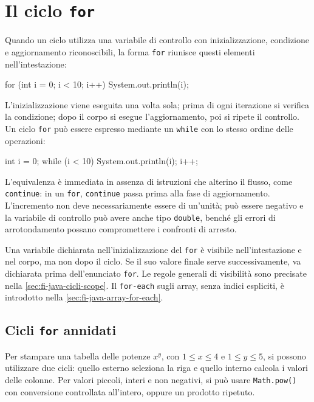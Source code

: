\section{Il ciclo \texttt{for}}
\label{sec:fi-java-cicli-for}

Quando un ciclo utilizza una variabile di controllo con
inizializzazione, condizione e aggiornamento riconoscibili,
la forma \texttt{for} riunisce questi elementi nell'intestazione:

\begin{unipdcode}[language=Java]
for (int i = 0; i < 10; i++) {
    System.out.println(i);
}
\end{unipdcode}

L'inizializzazione viene eseguita una volta sola; prima di ogni
iterazione si verifica la condizione; dopo il corpo si esegue
l'aggiornamento, poi si ripete il controllo. Un ciclo
\texttt{for} può essere espresso mediante un \texttt{while}
con lo stesso ordine delle operazioni:

\begin{unipdcode}[language=Java]
int i = 0;
while (i < 10) {
    System.out.println(i);
    i++;
}
\end{unipdcode}

L'equivalenza è immediata in assenza di istruzioni che alterino
il flusso, come \texttt{continue}: in un \texttt{for},
\texttt{continue} passa prima alla fase di aggiornamento.
L'incremento non deve necessariamente essere di un'unità;
può essere negativo e la variabile di controllo può avere anche
tipo \texttt{double}, benché gli errori di arrotondamento possano
compromettere i confronti di arresto.

Una variabile dichiarata nell'inizializzazione del \texttt{for}
è visibile nell'intestazione e nel corpo, ma non dopo il ciclo.
Se il suo valore finale serve successivamente, va dichiarata
prima dell'enunciato \texttt{for}. Le regole generali di
visibilità sono precisate nella \cref{sec:fi-java-cicli-scope}.
Il \texttt{for-each} sugli array, senza indici espliciti, è
introdotto nella \cref{sec:fi-java-array-for-each}.

\subsection{Cicli \texttt{for} annidati}
\label{sec:fi-java-cicli-for-annidati}

Per stampare una tabella delle potenze \(x^y\), con
\(1\le x\le4\) e \(1\le y\le5\), si possono utilizzare
due cicli: quello esterno seleziona la riga e quello interno
calcola i valori delle colonne. Per valori piccoli, interi e
non negativi, si può usare \texttt{Math.pow()} con conversione
controllata all'intero, oppure un prodotto ripetuto.

